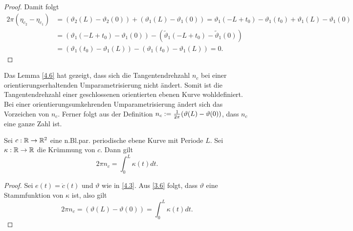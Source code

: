 \documentclass[11pt]{scrbook}
\newcommand{\tta}{\vartheta}
\begin{document}
\begin{lem}
\begin{proof}
Damit folgt
\begin{align*}
 2 \pi (\eta_{c_2} - \eta_{c_1})  &= (\tta_2(L) - \tta_2(0)) + (\tta_1(L) - \tta_1(0)) = \tta_1(-L + t_0) - \tta_1(t_0) + \tta_1(L) - \tta_1(0)  \\
& =  (\tta_1(-L+t_0) - \tta_1(0)) - (\tilde \tta_1(-L+t_0) - \tilde \tta_1(0)) \\ 
&= (\tta_1(t_0) -\tta_1(L)) - (\tta_1(t_0) - \tta_1(L))  = 0.
\end{align*}
\end{proof}
\end{lem}

Das Lemma \ref{4.6} hat gezeigt, dass sich die Tangentendrehzahl $n_c$ bei einer orientierungserhaltenden Umparametrisierung nicht ändert. Somit ist die Tangentendrehzahl einer geschlossenen orientierten ebenen Kurve wohldefiniert. Bei einer orientierungsumkehrenden Umparametrisierung ändert sich das Vorzeichen von $n_c$. Ferner folgt aus der Definition $n_c := \f{1}{2 \pi} (\tta(L) - \tta(0))$, dass $n_c$ eine ganze Zahl ist.

\begin{st}
\label{4.7}
Sei $c: \mathbb{R} \to \mathbb{R}^2$ eine n.Bl.par. periodische ebene Kurve mit Periode $L$. Sei $\kappa : \mathbb{R} \to \mathbb{R}$ die Krümmung von $c$. Dann gilt
\[ 2 \pi n_c = \int_0^L \kappa(t) dt .\]
\begin{proof}
Sei $e(t) = \dot c(t)$ und $\tta$ wie in \ref{4.3}. Aus \ref{3.6} folgt, dass $\tta$ eine Stammfunktion von $\kappa$ ist, also gilt \[ 2 \pi n_c = (\tta(L) - \tta(0)) = \int_0^L \kappa(t) dt . \]
\end{proof}
\end{st}
\end{document}
